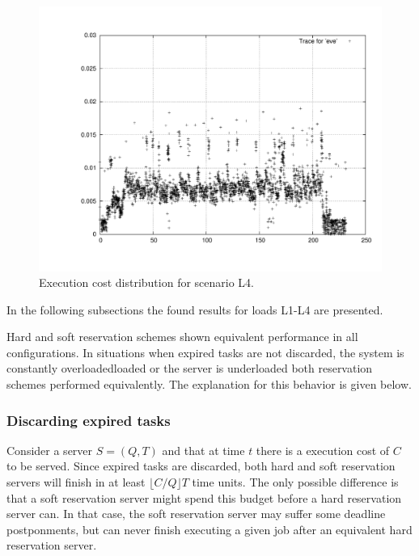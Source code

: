 \documentclass[times, 10pt,twocolumn]{article}
\begin{document}
\begin{figure}[h!t]
  \centering
  \includegraphics[scale=0.33]{trace-eve}
  \caption{Execution cost distribution for scenario L4.}
  \label{fig:plotl4}
\end{figure}

In the following subsections the found results for loads L1-L4 are presented. 

\label{sec:noDifference}

Hard and soft reservation schemes shown equivalent performance in all
configurations.  In situations when expired tasks are not discarded,
the system is constantly overloadedloaded or the server is underloaded
both reservation schemes performed equivalently. The explanation for
this behavior is given below.

\subsubsection{Discarding expired tasks}
\label{sec:disc-expir-tasks}

Consider a server $S = (Q,T)$ and that at time $t$ there is a
execution cost of $C$ to be served.  Since expired tasks are
discarded, both hard and soft reservation servers will finish in at
least $\lfloor C/Q \rfloor T$ time units.  The only possible
difference is that a soft reservation server might spend this budget
before a hard reservation server can. In that case, the soft
reservation server may suffer some deadline postponments, but can
never finish executing a given job after an equivalent hard
reservation server.
\end{document}
